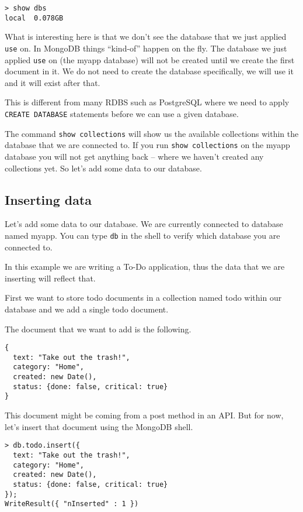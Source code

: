 \begin{lstlisting}
> show dbs
local  0.078GB
\end{lstlisting}

What is interesting here is that we don't see the database that we just applied \texttt{use} on. In MongoDB things ``kind-of'' happen on the fly. The database we just applied \texttt{use} on (the myapp database) will not be created until we create the first document in it. We do not need to create the database specifically, we will use it and it will exist after that.

This is different from many RDBS such as PostgreSQL where we need to apply \texttt{CREATE DATABASE} statements before we can use a given database.

The command \texttt{show collections} will show us the available collections within the database that we are connected to. If you run \texttt{show collections} on the myapp database you will not get anything back -- where we haven't created any collections yet.
So let's add some data to our database.

\subsection{Inserting data}
Let's add some data to our database. We are currently connected to database named myapp. You can type \texttt{db} in the shell to verify which database you are connected to.

In this example we are writing a To-Do application, thus the data that we are inserting will reflect that.

First we want to store todo documents in a collection named todo within our database and we add a single todo document.

The document that we want to add is the following.
\begin{lstlisting}
{
  text: "Take out the trash!",
  category: "Home",
  created: new Date(),
  status: {done: false, critical: true}
}
\end{lstlisting}

This document might be coming from a post method in an API. But for now, let's insert that document using the MongoDB shell.

\begin{lstlisting}
> db.todo.insert({
  text: "Take out the trash!",
  category: "Home",
  created: new Date(),
  status: {done: false, critical: true}
});
WriteResult({ "nInserted" : 1 })
\end{lstlisting}

